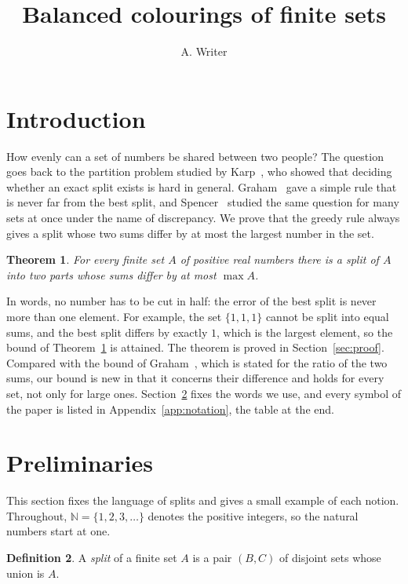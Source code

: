 \documentclass{amsart}
\title{Balanced colourings of finite sets}
\author{A. Writer}
\newtheorem{theorem}{Theorem}[section]
\theoremstyle{definition}
\newtheorem{definition}[theorem]{Definition}
\begin{document}
\maketitle

\section{Introduction}\label{sec:intro}

How evenly can a set of numbers be shared between two people? The question goes back to the partition problem studied by
Karp~\cite{karp}, who showed that deciding whether an exact split exists is hard in general. Graham~\cite{graham} gave a
simple rule that is never far from the best split, and Spencer~\cite{spencer} studied the same question for many sets at
once under the name of discrepancy. We prove that the greedy rule always gives a split whose two sums differ by at most the
largest number in the set.

\begin{theorem}\label{thm:main}
For every finite set $A$ of positive real numbers there is a split of $A$ into two parts whose sums differ by at most
$\max A$.
\end{theorem}

In words, no number has to be cut in half: the error of the best split is never more than one element. For example, the
set $\{1,1,1\}$ cannot be split into equal sums, and the best split differs by exactly $1$, which is the largest element,
so the bound of Theorem~\ref{thm:main} is attained. The theorem is proved in Section~\ref{sec:proof}. Compared with the
bound of Graham~\cite{graham}, which is stated for the ratio of the two sums, our bound is new in that it concerns their
difference and holds for every set, not only for large ones. Section~\ref{sec:prelim} fixes the words we use, and every
symbol of the paper is listed in Appendix~\ref{app:notation}, the table at the end.

\section{Preliminaries}\label{sec:prelim}

This section fixes the language of splits and gives a small example of each notion. Throughout, $\mathbb{N}=\{1,2,3,\dots\}$
denotes the positive integers, so the natural numbers start at one.

\begin{definition}\label{def:split}
A \emph{split} of a finite set $A$ is a pair $(B,C)$ of disjoint sets whose union is $A$.
\end{definition}
\end{document}
